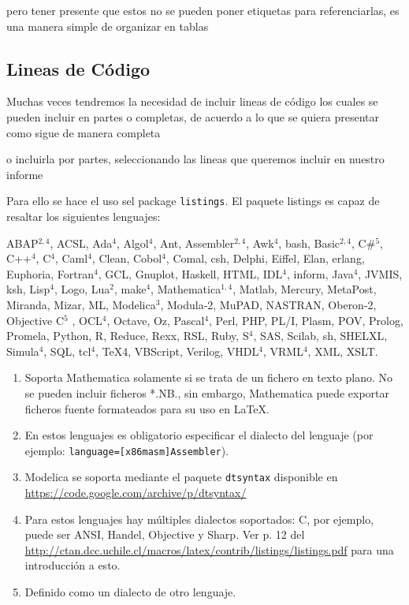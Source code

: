 \documentclass[a4paper]{IEEEtran} %
\begin{document}
pero tener presente que estos no se pueden poner etiquetas para referenciarlas, es una manera simple de organizar en tablas

\subsection{Lineas de Código}

Muchas veces tendremos la necesidad de incluir lineas de código los cuales se pueden incluir en partes o completas, de acuerdo a lo que se quiera presentar como sigue de manera completa



o incluirla por partes, seleccionando las lineas que queremos incluir en nuestro informe



Para ello se hace el uso sel package \texttt{listings}. El paquete listings es capaz de resaltar los siguientes lenguajes:

ABAP$^{2,4}$, ACSL, Ada$^4$, Algol$^4$, Ant, Assembler$^{2,4}$, Awk$^4$, bash, Basic$^{2,4}$, C\#$^{5}$, C++$^4$, C$^4$, Caml$^4$, Clean, Cobol$^4$, Comal, csh, Delphi, Eiffel, Elan, erlang, Euphoria, Fortran$^4$, GCL, Gnuplot, Haskell, HTML, IDL$^4$, inform, Java$^4$, JVMIS, ksh, Lisp$^4$, Logo, Lua$^2$, make$^4$, Mathematica$^{1,4}$, Matlab, Mercury, MetaPost, Miranda, Mizar, ML, Modelica$^3$, Modula-2, MuPAD, NASTRAN, Oberon-2, Objective C$^5$ , OCL$^4$, Octave, Oz, Pascal$^4$, Perl, PHP, PL/I, Plasm, POV, Prolog, Promela, Python, R, Reduce, Rexx, RSL, Ruby, S$^4$, SAS, Scilab, sh, SHELXL, Simula$^4$, SQL, tcl$^4$, TeX4, VBScript, Verilog, VHDL$^4$, VRML$^4$, XML, XSLT. 

\begin{enumerate}
\item Soporta Mathematica solamente si se trata de un fichero en texto plano. No se pueden incluir ficheros *.NB., sin embargo, Mathematica puede exportar ficheros fuente formateados para su uso en \LaTeX.
\item En estos lenguajes es obligatorio especificar el dialecto del lenguaje (por ejemplo: \texttt{language={[x86masm]Assembler}}).
\item Modelica se soporta mediante el paquete \texttt{dtsyntax} disponible en \url{https://code.google.com/archive/p/dtsyntax/}
\item Para estos lenguajes hay múltiples dialectos soportados: C, por ejemplo, puede ser ANSI, Handel, Objective y Sharp. Ver p. 12 del \url{http://ctan.dcc.uchile.cl/macros/latex/contrib/listings/listings.pdf} para una introducción a esto.
\item Definido como un dialecto de otro lenguaje.
\end{enumerate}
\end{document}
